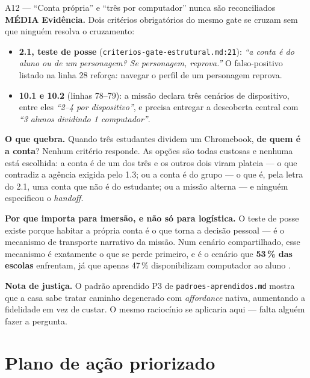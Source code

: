 \documentclass[11pt,a4paper]{article}
\newcommand{\sevmedia}{\textcolor{DarkYellow}{\textbf{M\'EDIA}}}
\begin{document}
\begin{achadobox}{A12 --- ``Conta pr\'opria'' e ``tr\^es por computador'' nunca s\~ao reconciliados \hfill \sevmedia}
\textbf{Evid\^encia.} Dois crit\'erios obrigat\'orios do mesmo gate se cruzam sem que ningu\'em
resolva o cruzamento:

\begin{itemize}
  \item \textbf{2.1, teste de posse} (\texttt{criterios-gate-estrutural.md:21}): \emph{``a conta
        \'e do aluno ou de um personagem? Se personagem, reprova.''} O falso-positivo listado na
        linha 28 refor\c{c}a: navegar o perfil de um personagem reprova.
  \item \textbf{10.1 e 10.2} (linhas 78--79): a miss\~ao declara tr\^es cen\'arios de dispositivo,
        entre eles \emph{``2--4 por dispositivo''}, e precisa entregar a descoberta central com
        \emph{``3 alunos dividindo 1 computador''}.
\end{itemize}

\textbf{O que quebra.} Quando tr\^es estudantes dividem um Chromebook, \textbf{de quem \'e a
conta}? Nenhum crit\'erio responde. As op\c{c}\~oes s\~ao todas custosas e nenhuma est\'a
escolhida: a conta \'e de um dos tr\^es e os outros dois viram plateia --- o que contradiz a
agência exigida pelo 1.3; ou a conta \'e do grupo --- o que \'e, pela letra do 2.1, uma conta que
n\~ao \'e do estudante; ou a miss\~ao alterna --- e ningu\'em especificou o \emph{handoff}.

\textbf{Por que importa para imers\~ao, e n\~ao s\'o para log\'istica.} O teste de posse existe
porque habitar a pr\'opria conta \'e o que torna a decis\~ao pessoal --- \'e o mecanismo de
transporte narrativo da miss\~ao. Num cen\'ario compartilhado, esse mecanismo \'e exatamente o que
se perde primeiro, e \'e o cen\'ario que \textbf{53\,\% das escolas} enfrentam, j\'a que apenas
47\,\% disponibilizam computador ao aluno \cite{ticedu2024}.

\textbf{Nota de justi\c{c}a.} O padr\~ao aprendido P3 de \texttt{padroes-aprendidos.md} mostra que
a casa sabe tratar caminho degenerado com \emph{affordance} nativa, aumentando a fidelidade em vez
de custar. O mesmo racioc\'inio se aplicaria aqui --- falta algu\'em fazer a pergunta.
\end{achadobox}

\section{Plano de a\c{c}\~ao priorizado}
\end{document}
